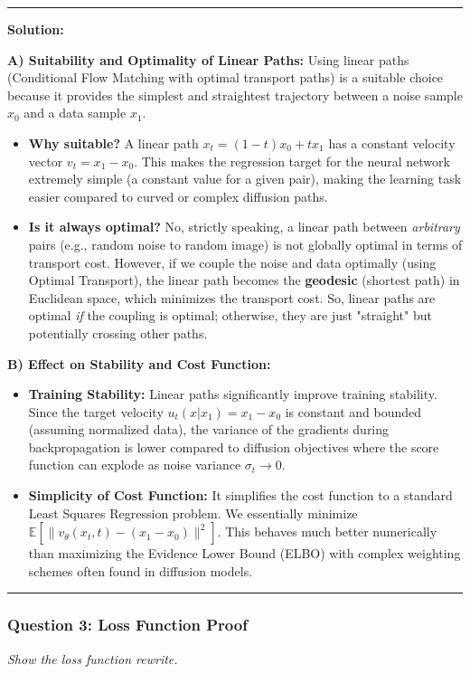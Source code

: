 \documentclass[a4paper,12pt]{article}
\newenvironment{solutionbox}{
    \par
    \vspace{0.5em}
    \noindent
    {\color{primary}\rule{\linewidth}{0.4pt}}
    \par\smallskip
    \noindent\textbf{\color{primary}Solution:}
    \par\smallskip
    \small
}{
    \par\smallskip
    {\color{primary}\rule{\linewidth}{0.4pt}}
    \par\vspace{0.5em}
}
\begin{document}
\begin{solutionbox}
    \textbf{A) Suitability and Optimality of Linear Paths:}
    Using linear paths (Conditional Flow Matching with optimal transport paths) is a suitable choice because it provides the simplest and straightest trajectory between a noise sample $x_0$ and a data sample $x_1$.
    \begin{itemize}
        \item \textbf{Why suitable?} A linear path $x_t = (1-t)x_0 + t x_1$ has a constant velocity vector $v_t = x_1 - x_0$. This makes the regression target for the neural network extremely simple (a constant value for a given pair), making the learning task easier compared to curved or complex diffusion paths.
        \item \textbf{Is it always optimal?} No, strictly speaking, a linear path between \textit{arbitrary} pairs (e.g., random noise to random image) is not globally optimal in terms of transport cost. However, if we couple the noise and data optimally (using Optimal Transport), the linear path becomes the \textbf{geodesic} (shortest path) in Euclidean space, which minimizes the transport cost. So, linear paths are optimal \textit{if} the coupling is optimal; otherwise, they are just "straight" but potentially crossing other paths.
    \end{itemize}

    \textbf{B) Effect on Stability and Cost Function:}
    \begin{itemize}
        \item \textbf{Training Stability:} Linear paths significantly improve training stability. Since the target velocity $u_t(x|x_1) = x_1 - x_0$ is constant and bounded (assuming normalized data), the variance of the gradients during backpropagation is lower compared to diffusion objectives where the score function can explode as noise variance $\sigma_t \to 0$.
        \item \textbf{Simplicity of Cost Function:} It simplifies the cost function to a standard Least Squares Regression problem. We essentially minimize $\mathbb{E}[\|v_\theta(x_t, t) - (x_1 - x_0)\|^2]$. This behaves much better numerically than maximizing the Evidence Lower Bound (ELBO) with complex weighting schemes often found in diffusion models.
    \end{itemize}
\end{solutionbox}

\subsubsection{Question 3: Loss Function Proof}
\textit{Show the loss function rewrite.}
\end{document}
